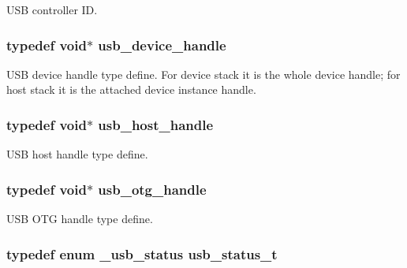 U\-S\-B controller I\-D. 

\hypertarget{group__usb__drv_gae62132dc6e5eba994f8aa56cb7399abc}{
\subsubsection[{usb\-\_\-device\-\_\-handle}]{\setlength{\rightskip}{0pt plus 5cm}typedef void$\ast$ {\bf usb\-\_\-device\-\_\-handle}}}\label{group__usb__drv_gae62132dc6e5eba994f8aa56cb7399abc}


U\-S\-B device handle type define. For device stack it is the whole device handle; for host stack it is the attached device instance handle. 

\hypertarget{group__usb__drv_ga54bc454c4d89ebc62bcdf09f5bdf688e}{
\subsubsection[{usb\-\_\-host\-\_\-handle}]{\setlength{\rightskip}{0pt plus 5cm}typedef void$\ast$ {\bf usb\-\_\-host\-\_\-handle}}}\label{group__usb__drv_ga54bc454c4d89ebc62bcdf09f5bdf688e}


U\-S\-B host handle type define. 

\hypertarget{group__usb__drv_ga7d25adf2128a3eba7b847eea081de6fe}{
\subsubsection[{usb\-\_\-otg\-\_\-handle}]{\setlength{\rightskip}{0pt plus 5cm}typedef void$\ast$ {\bf usb\-\_\-otg\-\_\-handle}}}\label{group__usb__drv_ga7d25adf2128a3eba7b847eea081de6fe}


U\-S\-B O\-T\-G handle type define. 

\hypertarget{group__usb__drv_ga3172b9f50553fb6d8aa2823d10a39c58}{
\subsubsection[{usb\-\_\-status\-\_\-t}]{\setlength{\rightskip}{0pt plus 5cm}typedef enum {\bf \-\_\-usb\-\_\-status}  {\bf usb\-\_\-status\-\_\-t}}}\label{group__usb__drv_ga3172b9f50553fb6d8aa2823d10a39c58}


